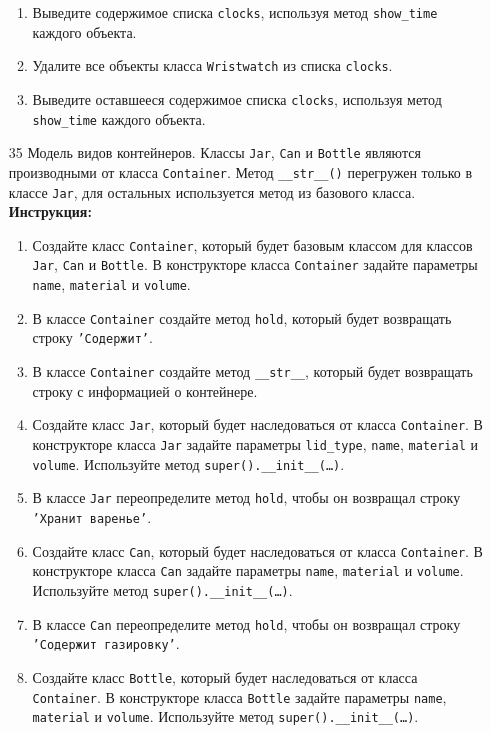 \begin{enumerate}
\begin{enumerate}
    \item Выведите содержимое списка \texttt{clocks}, используя метод \texttt{show\_time} каждого объекта.
    \item Удалите все объекты класса \texttt{Wristwatch} из списка \texttt{clocks}.
    \item Выведите оставшееся содержимое списка \texttt{clocks}, используя метод \texttt{show\_time} каждого объекта.
\end{enumerate}
\item[35]
Модель видов контейнеров. Классы \texttt{Jar}, \texttt{Can} и \texttt{Bottle} являются производными от класса \texttt{Container}. Метод \texttt{\_\_str\_\_()} перегружен только в классе \texttt{Jar}, для остальных используется метод из базового класса.
\textbf{Инструкция:}
\begin{enumerate}
    \item Создайте класс \texttt{Container}, который будет базовым классом для классов \texttt{Jar}, \texttt{Can} и \texttt{Bottle}. В конструкторе класса \texttt{Container} задайте параметры \texttt{name}, \texttt{material} и \texttt{volume}.
    \item В классе \texttt{Container} создайте метод \texttt{hold}, который будет возвращать строку \texttt{'Содержит'}.
    \item В классе \texttt{Container} создайте метод \texttt{\_\_str\_\_}, который будет возвращать строку с информацией о контейнере.
    \item Создайте класс \texttt{Jar}, который будет наследоваться от класса \texttt{Container}. В конструкторе класса \texttt{Jar} задайте параметры \texttt{lid\_type}, \texttt{name}, \texttt{material} и \texttt{volume}. Используйте метод \texttt{super().\_\_init\_\_(\ldots)}.
    \item В классе \texttt{Jar} переопределите метод \texttt{hold}, чтобы он возвращал строку \texttt{'Хранит варенье'}.
    \item Создайте класс \texttt{Can}, который будет наследоваться от класса \texttt{Container}. В конструкторе класса \texttt{Can} задайте параметры \texttt{name}, \texttt{material} и \texttt{volume}. Используйте метод \texttt{super().\_\_init\_\_(\ldots)}.
    \item В классе \texttt{Can} переопределите метод \texttt{hold}, чтобы он возвращал строку \texttt{'Содержит газировку'}.
    \item Создайте класс \texttt{Bottle}, который будет наследоваться от класса \texttt{Container}. В конструкторе класса \texttt{Bottle} задайте параметры \texttt{name}, \texttt{material} и \texttt{volume}. Используйте метод \texttt{super().\_\_init\_\_(\ldots)}.

\end{enumerate}
\end{enumerate}
